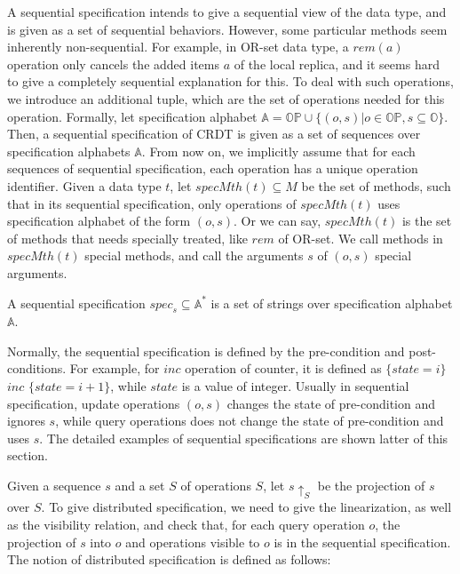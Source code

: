 A sequential specification intends to give a sequential view of the data type, and is given as a set of sequential behaviors. However, some particular methods seem inherently non-sequential. For example, in OR-set data type, a $rem(a)$ operation only cancels the added items $a$ of the local replica, and it seems hard to give a completely sequential explanation for this. To deal with such operations, we introduce an additional tuple, which are the set of operations needed for this operation. Formally, let specification alphabet $\mathbb{A} = \mathbb{OP} \cup \{ (o,s) \vert o \in \mathbb{OP}, s \subseteq \mathbb{O} \}$. Then, a sequential specification of CRDT is given as a set of sequences over specification alphabets $\mathbb{A}$. From now on, we implicitly assume that for each sequences of sequential specification, each operation has a unique operation identifier. Given a data type $t$, let $\mathit{specMth}(t) \subseteq M$ be the set of methods, such that in its sequential specification, only operations of $\mathit{specMth}(t)$ uses specification alphabet of the form $(o,s)$. Or we can say, $\mathit{specMth}(t)$ is the set of methods that needs specially treated, like $rem$ of OR-set. We call methods in $\mathit{specMth}(t)$ special methods, and call the arguments $s$ of $(o,s)$ special arguments. 

\begin{definition}
\label{definition:sequential specification}
A sequential specification $\mathit{spec}_s \subseteq \mathbb{A}^*$ is a set of strings over specification alphabet $\mathbb{A}$.
\end{definition}

Normally, the sequential specification is defined by the pre-condition and post-conditions. For example, for $inc$ operation of counter, it is defined as $\{ state = i \}$ $inc$ $\{ state = i+1 \}$, while $state$ is a value of integer. Usually in sequential specification, update operations $(o,s)$ changes the state of pre-condition and ignores $s$, while query operations does not change the state of pre-condition and uses $s$. The detailed examples of sequential specifications are shown latter of this section.

 Given a sequence $s$ and a set $S$ of operations $S$, let $s \uparrow_{S}$ be the projection of $s$ over $S$. To give distributed specification, we need to give the linearization, as well as the visibility relation, and check that, for each query operation $o$, the projection of $s$ into $o$ and operations visible to $o$ is in the sequential specification. The notion of distributed specification is defined as follows:


